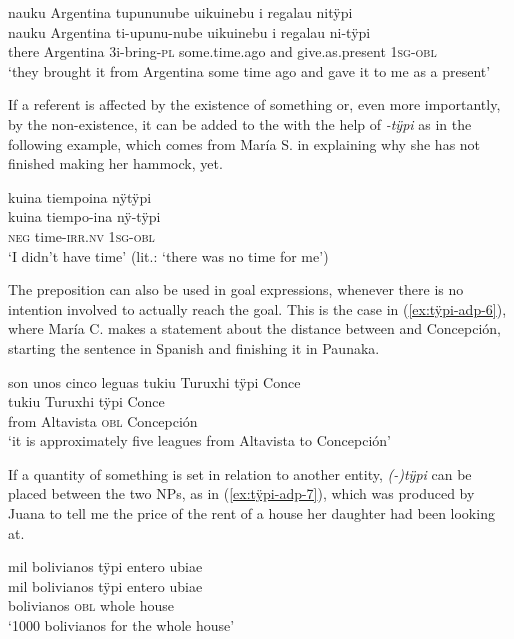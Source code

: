 \ea\label{ex:adp-tÿpi-5}
\begingl
\glpreamble nauku Argentina tupununube uikuinebu i regalau nitÿpi\\
\gla nauku Argentina ti-upunu-nube uikuinebu i regalau ni-tÿpi\\
\glb there Argentina 3i-bring-\textsc{pl} some.time.ago and give.as.present 1\textsc{sg}-\textsc{obl}\\
\glft ‘they brought it from Argentina some time ago and gave it to me as a present’
\endgl
\trailingcitation{[jxx-e120430l-4.28-29]}
\xe

If a referent is affected by the existence of something or, even more importantly, by the non-existence, it can be added to the  with the help of \textit{-tÿpi} as in the following example, which comes from María S. in explaining why she has not finished making her hammock, yet.

\ea\label{ex:adp-tÿpi-9}
\begingl
\glpreamble kuina tiempoina nÿtÿpi\\
\gla kuina tiempo-ina nÿ-tÿpi\\
\glb \textsc{neg} time-\textsc{irr.nv} 1\textsc{sg}-\textsc{obl}\\
\glft ‘I didn’t have time’ (lit.: ‘there was no time for me’)
\endgl
\trailingcitation{[rxx-e181022le]}
\xe

The preposition can also be used in goal expressions, whenever there is no intention involved to actually reach the goal. This is the case in (\ref{ex:tÿpi-adp-6}), where María C. makes a statement about the distance between  and Concepción, starting the sentence in Spanish and finishing it in Paunaka.%

\ea\label{ex:tÿpi-adp-6}
\begingl
\glpreamble son unos cinco leguas tukiu Turuxhi tÿpi Conce\\
 tukiu Turuxhi tÿpi Conce\\
 from Altavista \textsc{obl} Concepción\\
\glft ‘it is approximately five leagues from Altavista to Concepción’
\endgl
\trailingcitation{[cux-c120414ls-1.159]}
\xe

If a quantity of something is set in relation to another entity, \textit{(-)tÿpi} can be placed between the two NPs, as in (\ref{ex:tÿpi-adp-7}), which was produced by Juana to tell me the price of the rent of a house her daughter had been looking at.

\ea\label{ex:tÿpi-adp-7}
\begingl
\glpreamble mil bolivianos tÿpi entero ubiae \\
\gla mil bolivianos tÿpi entero ubiae\\
 bolivianos \textsc{obl} whole house\\
\glft ‘1000 bolivianos for the whole house’
\endgl
\trailingcitation{[jxx-p120430l-1.368-369]}
\xe

